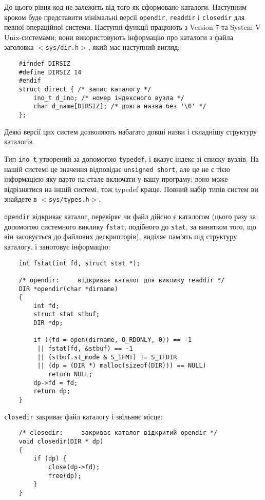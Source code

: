 \documentclass[a4paper,12pt]{book}
\begin{document}
  До цього рівня код не залежить від того як сформовано каталоги. Наступним кроком буде
  представити мінімальні версії \texttt{opendir}, \texttt{readdir} і \texttt{closedir} для
  певної операційної системи. Наступні функції працюють з Version 7 та System V
  Unix-системами; вони використовують інформацію про каталоги з файла заголовка
  \texttt{\mbox{$<$}sys/dir.h\mbox{$>$}}, який має наступний вигляд:
  \begin{verbatim}
    #ifndef DIRSIZ
    #define DIRSIZ 14
    #endif
    struct direct { /* запис каталогу */
        ino_t d_ino; /* номер індексного вузла */
        char d_name[DIRSIZ]; /* довга назва без '\0' */
    };
  \end{verbatim}

  Деякі версії цих систем дозволяють набагато довші назви і складнішу структуру
  каталогів.

  Тип \texttt{ino\_t} утворений за допомогою \texttt{typedef}, і вказує індекс зі списку
  вузлів. На нашій системі це значення відповідає \texttt{unsigned short}, але це не є
  тією інформацією яку варто на стале включати у вашу програму; воно може відрізнятися на
  іншій системі, тож typedef краще. Повний набір типів систем ви знайдете в
  \texttt{\mbox{$<$}sys/types.h\mbox{$>$}}.

  \texttt{opendir} відкриває каталог, перевіряє чи файл дійсно є каталогом (цього
  разу за допомогою системного виклику \texttt{fstat}, подібного до \texttt{stat}, за
  винятком того, що він засовується до файлових дескрипторів), виділяє пам'ять під
  структуру каталогу, і занотовує інформацію:
  \begin{verbatim}
    int fstat(int fd, struct stat *);

    /* opendir:     відкриває каталог для виклику readdir */
    DIR *opendir(char *dirname)
    {
        int fd;
        struct stat stbuf;
        DIR *dp;

        if ((fd = open(dirname, O_RDONLY, 0)) == -1
         || fstat(fd, &stbuf) == -1
         || (stbuf.st_mode & S_IFMT) != S_IFDIR
         || (dp = (DIR *) malloc(sizeof(DIR))) == NULL)
            return NULL;
        dp->fd = fd;
        return dp;
    }
  \end{verbatim}
  \texttt{closedir} закриває файл каталогу і звільняє місце:
  \begin{verbatim}
    /* closedir:     закриває каталог відкритий opendir */
    void closedir(DIR * dp)
    {
        if (dp) {
            close(dp->fd);
            free(dp);
        }
    }
  \end{verbatim}
\end{document}
